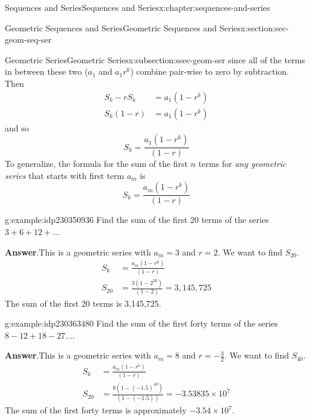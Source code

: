 \documentclass[twoside,10pt,]{book}
\newcommand{\blocktitlefont}{\relax}
\numberwithin{equation}{section}
\newcommand{\amp}{&}
\begin{document}
\begin{chapterptx}{Sequences and Series}{}{Sequences and Series}{}{}{x:chapter:sequences-and-series}
\begin{sectionptx}{Geometric Sequences and Series}{}{Geometric Sequences and Series}{}{}{x:section:sec-geom-seq-ser}
\begin{subsectionptx}{Geometric Series}{}{Geometric Series}{}{}{x:subsection:ssec-geom-ser}
since all of the terms in between these two (\(a_1\) and \(a_1r^k\)) combine pair-wise to zero by subtraction.  Then%
\begin{align*}
{S_k} - r{S_k}\amp = {a_1}\left( {1 - {r^k}} \right)\\
{S_k}\left( {1 - r} \right) \amp = {a_1}\left( {1 - {r^k}} \right)
\end{align*}
and so%
\begin{equation*}
{S_k} = \frac{{{a_1}\left( {1 - {r^k}} \right)}}{{\left( {1 - r} \right)}}
\end{equation*}
To generalize, the formula for the sum of the first \(n\) terms for \emph{any geometric series}  that starts with first term \(a_m\) is%
\begin{equation*}
{S_k} = \frac{{{a_m}\left( {1 - {r^k}} \right)}}{{\left( {1 - r} \right)}}
\end{equation*}
\begin{example}{}{g:example:idp230350936}%
Find the sum of the first 20 terms of the series \(3 + 6 + 12 + \ldots\)\par\smallskip%
\noindent\textbf{\blocktitlefont Answer}.\label{g:answer:idp230352216}{}\hypertarget{g:answer:idp230352216}{}\quad{}This is a geometric series with \(a_m = 3\) and \(r = 2\).  We want to find \(S_{20}\).%
\begin{align*}
{S_k} \amp = \frac{{{a_m}\left( {1 - {r^k}} \right)}}{{\left( {1 - r} \right)}}\\
{S_{20}} \amp = \frac{{3\left( {1 - {2^{20}}} \right)}}{{\left( {1 - 2} \right)}} = 3,145,725
\end{align*}
The sum of the first 20 terms is 3,145,725.\end{example}
 \begin{example}{}{g:example:idp230363480}%
Find the sum of the first forty terms of the series \(8 - 12 + 18 - 27 \ldots\).\par\smallskip%
\noindent\textbf{\blocktitlefont Answer}.\label{g:answer:idp230359768}{}\hypertarget{g:answer:idp230359768}{}\quad{}This is a geometric series with \(a_m = 8\) and \(r = -\frac{3}{2}\).  We want to find \(S_{40}\).%
\begin{align*}
{S_k} \amp = \frac{{{a_m}\left( {1 - {r^k}} \right)}}{{\left( {1 - r} \right)}}\\
{S_{20}} \amp = \frac{{8\left( {1 - {{\left( { - 1.5} \right)}^{40}}} \right)}}{{\left( {1 - \left( { - 1.5} \right)} \right)}} =  - 3.53835 \times {10^7}
\end{align*}
The sum of the first forty terms is approximately \(-3.54 \times{} 10^7\).\end{example}

\end{subsectionptx}
\end{sectionptx}
\end{chapterptx}
\end{document}
